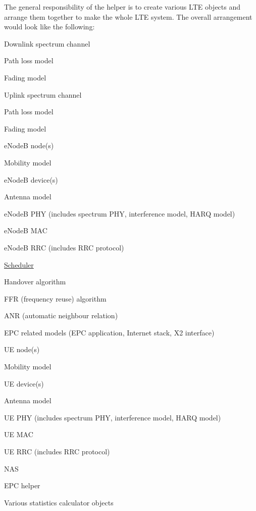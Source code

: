 The general responsibility of the helper is to create various L\+TE objects and arrange them together to make the whole L\+TE system. The overall arrangement would look like the following\+:
\begin{DoxyItemize}
\item Downlink spectrum channel
\begin{DoxyItemize}
\item Path loss model
\item Fading model
\end{DoxyItemize}
\item Uplink spectrum channel
\begin{DoxyItemize}
\item Path loss model
\item Fading model
\end{DoxyItemize}
\item e\+NodeB node(s)
\begin{DoxyItemize}
\item Mobility model
\item e\+NodeB device(s)
\begin{DoxyItemize}
\item Antenna model
\item e\+NodeB P\+HY (includes spectrum P\+HY, interference model, H\+A\+RQ model)
\item e\+NodeB M\+AC
\item e\+NodeB R\+RC (includes R\+RC protocol)
\item \hyperlink{classns3_1_1Scheduler}{Scheduler}
\item Handover algorithm
\item F\+FR (frequency reuse) algorithm
\item A\+NR (automatic neighbour relation)
\end{DoxyItemize}
\item E\+PC related models (E\+PC application, Internet stack, X2 interface)
\end{DoxyItemize}
\item UE node(s)
\begin{DoxyItemize}
\item Mobility model
\item UE device(s)
\begin{DoxyItemize}
\item Antenna model
\item UE P\+HY (includes spectrum P\+HY, interference model, H\+A\+RQ model)
\item UE M\+AC
\item UE R\+RC (includes R\+RC protocol)
\item N\+AS
\end{DoxyItemize}
\end{DoxyItemize}
\item E\+PC helper
\item Various statistics calculator objects
\end{DoxyItemize}

